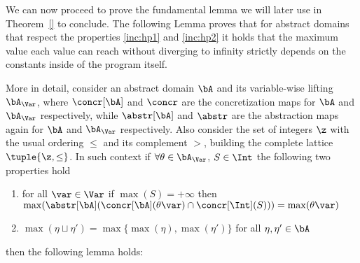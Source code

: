 We can now proceed to prove the fundamental lemma we will later use in
Theorem~\ref{} to conclude. The following Lemma proves that for
abstract domains that respect the properties \ref{inc:hp1} and
\ref{inc:hp2} it holds that the maximum value each value can reach
without diverging to infinity strictly depends on the constants inside
of the program itself.

\medskip

\noindent
More in detail, consider an abstract domain \(\bA\) and its
variable-wise lifting \(\bA_\Var\), where \(\concr[\bA]\) and
\(\concr\) are the concretization maps for \(\bA\) and \(\bA_\Var\)
respectively, while \(\abstr[\bA]\) and \(\abstr\) are the abstraction
maps again for \(\bA\) and \(\bA_\Var\) respectively. Also consider
the set of integers \(\z\) with the usual ordering \(\leq\) and its
complement \(>\), building the complete lattice \(\tuple{\z,
  \leq}\). In such context if \(\forall \theta \in \bA_\Var\),
\(S \in \Int\) the following two properties hold
\begin{enumerate}[label=(\Roman*)]
\item\label{inc:hp1} for all \(\var\in\Var\) if
  \(\max(S) = +\infty\) then
  \(\max(\abstr[\bA](\concr[\bA](\theta\var) \cap \concr[\Int](S))) = \max(\theta\var)\)
\item\label{inc:hp2}
  \(\max(\eta \sqcup \eta') = \max\{\max(\eta), \max(\eta')\}\) for
  all \(\eta, \eta'\in \bA\)
\end{enumerate}

\noindent
then the following lemma holds:

